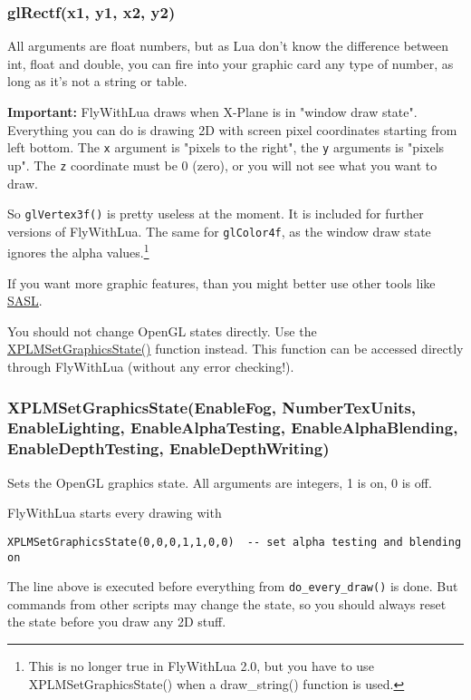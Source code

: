\documentclass[11pt,parskip=half,a4paper]{scrartcl}
\begin{document}
\subsubsection{glRectf(x1, y1, x2, y2)}

All arguments are float numbers, but as Lua don't know the difference between int, float and double, you can fire into your graphic card any type of number, as long as it's not a string or table.

\textbf{Important:} FlyWithLua draws when X-Plane is in "window draw state". Everything you can do is drawing 2D with screen pixel coordinates starting from left bottom. The \verb|x| argument is "pixels to the right", the \verb|y| arguments is "pixels up". The \verb|z| coordinate must be 0 (zero), or you will not see what you want to draw.

So \verb|glVertex3f()| is pretty useless at the moment. It is included for further versions of FlyWithLua. The same for \verb|glColor4f|, as the window draw state ignores the alpha values.\footnote{This is no longer true in FlyWithLua 2.0, but you have to use XPLMSetGraphicsState() when a draw\_string() function is used.}

If you want more graphic features, than you might better use other tools like \href{http://code.google.com/p/sasl/}{SASL}.

You should not change OpenGL states directly. Use the \href{http://www.xsquawkbox.net/xpsdk/mediawiki/XPLMSetGraphicsState}{XPLMSetGraphicsState()} function instead. This function can be accessed directly through FlyWithLua (without any error checking!).

\subsubsection{XPLMSetGraphicsState(EnableFog, NumberTexUnits, EnableLighting, EnableAlphaTesting, EnableAlphaBlending, EnableDepthTesting, EnableDepthWriting)}

Sets the OpenGL graphics state. All arguments are integers, 1 is on, 0 is off.

FlyWithLua starts every drawing with

\verb|XPLMSetGraphicsState(0,0,0,1,1,0,0)  -- set alpha testing and blending on|

The line above is executed before everything from \verb|do_every_draw()| is done. But commands from other scripts may change the state, so you should always reset the state before you draw any 2D stuff.
\end{document}
